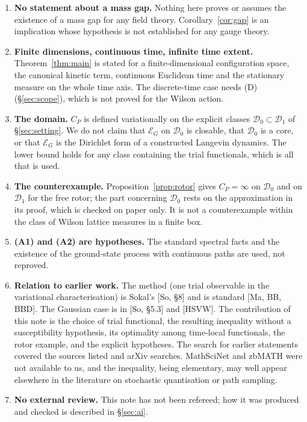 \documentclass[11pt,a4paper]{article}
\theoremstyle{definition}
\theoremstyle{remark}
\newcommand{\cE}{\mathcal{E}}
\newcommand{\cD}{\mathcal{D}}
\begin{document}
\begin{enumerate}[label=\arabic*.]
\item \textbf{No statement about a mass gap.} Nothing here proves or assumes the existence of a mass gap for any field theory. Corollary~\ref{cor:gap} is an implication whose hypothesis is not established for any gauge theory.
\item \textbf{Finite dimensions, continuous time, infinite time extent.} Theorem~\ref{thm:main} is stated for a finite-dimensional configuration space, the canonical kinetic term, continuous Euclidean time and the stationary measure on the whole time axis. The discrete-time case needs (D) (\S\ref{sec:scope}), which is not proved for the Wilson action.
\item \textbf{The domain.} $C_P$ is defined variationally on the explicit classes $\cD_0\subset\cD_1$ of \S\ref{sec:setting}. We do not claim that $\cE_G$ on $\cD_0$ is closable, that $\cD_0$ is a core, or that $\cE_G$ is the Dirichlet form of a constructed Langevin dynamics. The lower bound holds for any class containing the trial functionals, which is all that is used.
\item \textbf{The counterexample.} Proposition~\ref{prop:rotor} gives $C_P=\infty$ on $\cD_0$ and on $\cD_1$ for the free rotor; the part concerning $\cD_0$ rests on the approximation in its proof, which is checked on paper only. It is not a counterexample within the class of Wilson lattice measures in a finite box.
\item \textbf{(A1) and (A2) are hypotheses.} The standard spectral facts and the existence of the ground-state process with continuous paths are used, not reproved.
\item \textbf{Relation to earlier work.} The method (one trial observable in the variational characterisation) is Sokal's [So, \S8] and is standard [Ma, BB, BBD]. The Gaussian case is in [So, \S5.3] and [HSVW]. The contribution of this note is the choice of trial functional, the resulting inequality without a susceptibility hypothesis, its optimality among time-local functionals, the rotor example, and the explicit hypotheses. The search for earlier statements covered the sources listed and arXiv searches. MathSciNet and zbMATH were not available to us, and the inequality, being elementary, may well appear elsewhere in the literature on stochastic quantisation or path sampling.
\item \textbf{No external review.} This note has not been refereed; how it was produced and checked is described in \S\ref{sec:ai}.
\end{enumerate}
\end{document}
